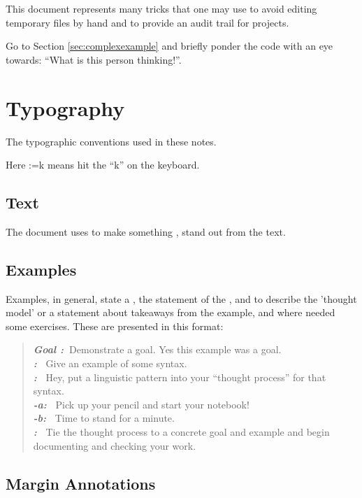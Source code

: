\documentclass[letter,11pt,oneside]{article}
\makeatletter
\newcommand\llbox[1]{%
  \@tfor\@ii:=#1\do{%
    {\color{verbcolor}\Ovalbox{\strut\@ii}}%
  }%
}
\newcommand{\dhl}[1]{{\color{verbcolor}{\texttt#1}}}
\newcounter{teachcounter}
\newcommand{\goal}{%
  \stepcounter{teachcounter}%
  \textbf{\emph{Goal \theteachcounter:}~}}
\newcommand{\exercise}[1][] {\textbf{\emph{\color{verbcolor}{Exercise} \theteachcounter #1:}~ }}
\newcommand{\example}  {\textbf{\emph{\color{verbcolor}{Example} \theteachcounter :}~ }}
\newcommand{\prose}    {\textbf{\emph{\color{verbcolor}{Prose} \theteachcounter :}~ }}
\newcommand{\takeaway} {\textbf{\emph{\color{verbcolor}{Take Away} \theteachcounter :}~ }}
\makeatother
\begin{document}
This \dhl{Bon Mots} document represents many tricks that one may use
to avoid editing temporary files by hand and to provide an audit trail
for projects.

Go to Section \ref{sec:complexexample} and briefly ponder the code with an
eye towards: ``What is this person thinking!''.

\section{Typography} \label{sec:Typography}

The typographic conventions used in these notes.

Here \llbox{k} means hit the ``k'' on the keyboard. 

\subsection*{Text}

The document uses \dhl{color} to make something \dhl{interesting},
stand out from the text.

\subsection*{Examples}

Examples, in general, state a \dhl{Goal}, the statement of the
\dhl{example}, and \dhl{Prose} to describe the 'thought model' or a
statement about takeaways from the example, and where needed some
exercises. These are presented in this format:

\begin{quote}
\goal Demonstrate a goal. Yes this example was a goal.\\ \example Give
an example of some syntax.\\ \prose Hey, put a linguistic pattern into
your ``thought process'' for that syntax.\\ \exercise[-a] Pick up your
pencil and start your notebook! \\ \exercise[-b] Time to stand for a
minute. \\ \takeaway Tie the thought process to a concrete goal and
example and begin documenting and checking your work.
\end{quote}

\subsection{Margin Annotations}
\end{document}
